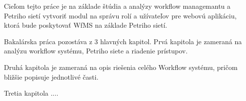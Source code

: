 Cieľom tejto práce je na základe štúdia a analýzy workflow managemantu  a Petriho sietí vytvoriť modul na správu rolí a užívateľov pre webovú aplikáciu, ktorá bude poskytovať WfMS na základe Petriho sietí. 

Bakalárska práca pozostáva z 3 hlavných kapitol. Prvá kapitola je zameraná na analýzu workflow systému, Petriho siete a riadenie prístupov.

Druhá kapitola je zameraná na opis riešenia celého Workflow systému, pričom bližšie popisuje jednotlivé časti.


Tretia kapitola .... 

 




















